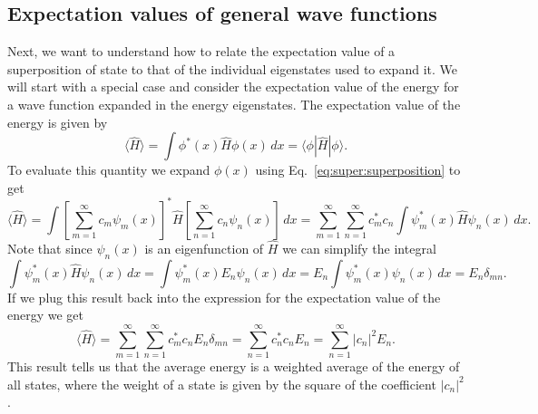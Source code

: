 \documentclass[../Main/chem331-notes.tex]{subfiles}
\begin{document}
\subsection{Expectation values of general wave functions}
Next, we want to understand how to relate the expectation value of a superposition of state to that of the individual eigenstates used to expand it.
We will start with a special case and consider the expectation value of the energy for a wave function expanded in the energy eigenstates.
The expectation value of the energy is given by
\begin{equation}
\langle \hat{H} \rangle = \int \phi^*(x) \hat{H} \phi(x) \, dx = \langle{\phi}|\hat{H}|{\phi}\rangle.
\end{equation}
To evaluate this quantity we expand $\phi(x)$ using Eq.~\eqref{eq:super:superposition} to get
\begin{equation}
\langle \hat{H} \rangle = \int \left[ \sum_{m = 1}^\infty c_m \psi_m(x) \right]^*  \hat{H} \left[ \sum_{n = 1}^\infty c_n \psi_n(x) \right] \, dx
 = \sum_{m = 1}^\infty \sum_{n = 1}^\infty   c^*_m c_n \int \psi^*_m(x) \hat{H} \psi_n(x) \, dx.
\end{equation}
Note that since $\psi_n(x)$ is an eigenfunction of $\hat{H}$ we can simplify the integral
\begin{equation}
\int \psi^*_m(x) \hat{H} \psi_n(x) \, dx =   \int \psi^*_m(x) E_n \psi_n(x) \, dx
=  E_n \int \psi^*_m(x) \psi_n(x) \, dx = E_n \delta_{mn}.
\end{equation}
If we plug this result back into the expression for the expectation value of the energy we get
\begin{equation}
\langle \hat{H} \rangle = \sum_{m = 1}^\infty \sum_{n = 1}^\infty   c^*_m c_n E_n \delta_{mn} = \sum_{n = 1}^\infty   c^*_n c_n E_n = \sum_{n = 1}^\infty   |c_n|^2 E_n.
\end{equation}
This result tells us that the average energy is a weighted average of the energy of all states, where the weight of a state is given by the square of the coefficient $|c_n|^2$.
\end{document}
